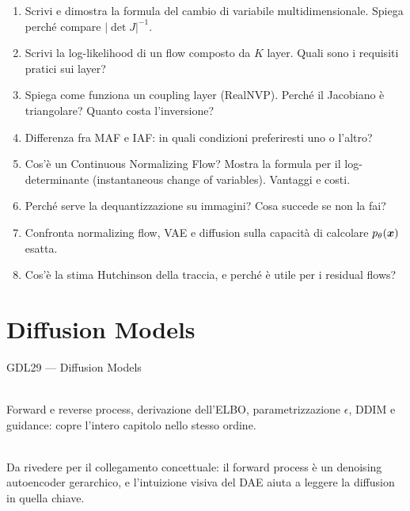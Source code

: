 \begin{tcolorbox}[mywarn, title={Domande d'esame — Normalizing Flows}]
\begin{enumerate}
  \item Scrivi e dimostra la formula del cambio di variabile multidimensionale. Spiega perché compare $|\det J|^{-1}$.
  \item Scrivi la log-likelihood di un flow composto da $K$ layer. Quali sono i requisiti pratici sui layer?
  \item Spiega come funziona un coupling layer (RealNVP). Perché il Jacobiano è triangolare? Quanto costa l'inversione?
  \item Differenza fra MAF e IAF: in quali condizioni preferiresti uno o l'altro?
  \item Cos'è un Continuous Normalizing Flow? Mostra la formula per il log-determinante (instantaneous change of variables). Vantaggi e costi.
  \item Perché serve la dequantizzazione su immagini? Cosa succede se non la fai?
  \item Confronta normalizing flow, VAE e diffusion sulla capacità di calcolare $p_\theta(\bm{x})$ esatta.
  \item Cos'è la stima Hutchinson della traccia, e perché è utile per i residual flows?
\end{enumerate}
\end{tcolorbox}

\chapter{Diffusion Models}
\label{ch:diffusion}

\begin{risorsevideo}{GDL29 — Diffusion Models}

\medskip
{}\\
Forward e reverse process, derivazione dell'ELBO, parametrizzazione $\epsilon$, DDIM e guidance: copre l'intero capitolo nello stesso ordine.

\medskip
{}\\
Da rivedere per il collegamento concettuale: il forward process è un denoising autoencoder gerarchico, e l'intuizione visiva del DAE aiuta a leggere la diffusion in quella chiave.
\end{risorsevideo}

